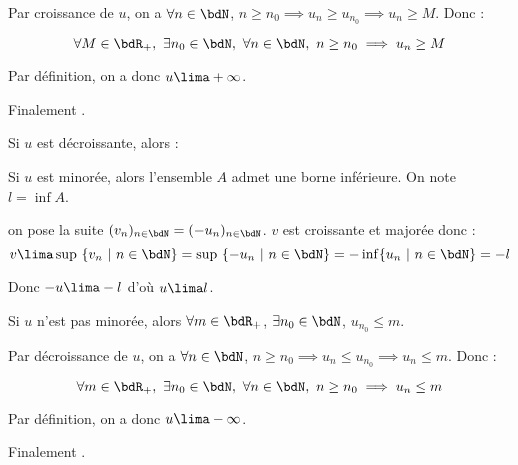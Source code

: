 \documentclass[a4paper,french,bookmarks]{article}
\begin{document}
\begin{enumerate}
{\begin{enumerate}
\begin{enumerate}
                Par croissance de $u$, on a $\forall n \in \bdN$, $n \geq n_0 \implies u_n \geq u_{n_0} \implies u_n \geq M$. Donc :
        
                \[ \forall M \in \bdR_+,\ \exists n_0 \in \bdN,\ \forall n \in \bdN,\ n \geq n_0 \implies u_n \geq M\]
        
                Par définition, on a donc $u \lima +\infty$.
            \end{enumerate}
            Finalement .
        
        \itb Si $u$ est décroissante, alors :
            
            \begin{enumerate}
                \itvararr  Si $u$ est minorée, alors l'ensemble $A$ admet une borne inférieure. On note $l = \inf A$.
                
                on pose la suite $(v_n)_{n \in \bdN} = (-u_n)_{n \in \bdN}$. $v$ est croissante et majorée donc :
                \[ v \lima \sup \ \{v_n \ | \ n \in \bdN\} = \sup \ \{-u_n \ | \ n \in \bdN\} = - \inf \{u_n \ | \ n \in \bdN\} = - l\] 
                
                Donc $-u \lima -l$ d'où $u \lima l$.
                
                \itvararr Si $u$ n'est pas minorée, alors $\forall m \in \bdR_+$, $\exists n_0 \in \bdN$, $u_{n_0} \leq m$.
        
                Par décroissance de $u$, on a $\forall n \in \bdN$, $n \geq n_0 \implies u_n \leq u_{n_0} \implies u_n \leq m$. Donc :
        
                \[ \forall m \in \bdR_+,\ \exists n_0 \in \bdN,\ \forall n \in \bdN,\ n \geq n_0 \implies u_n \leq m\]
        
                Par définition, on a donc $u \lima -\infty$.
            \end{enumerate}
            Finalement .
        \end{enumerate}
        
        
        
        
        

    }
    
\end{enumerate}
\end{document}

